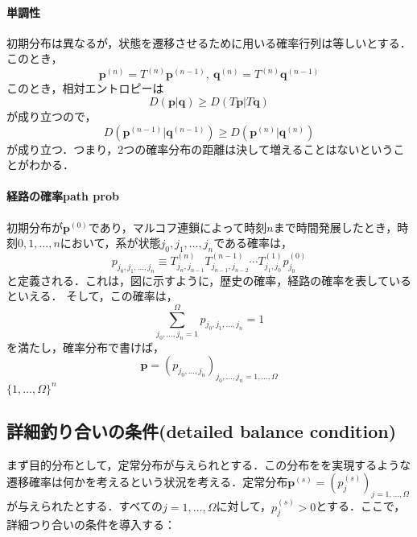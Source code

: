\paragraph{単調性}
初期分布は異なるが，状態を遷移させるために用いる確率行列は等しいとする．このとき，
\begin{equation}
    \bm{p}^{(n)}=T^{(n)}\bm{p}^{(n-1)},\ \bm{q}^{(n)}=T^{(n)}\bm{q}^{(n-1)}
\end{equation}
このとき，相対エントロピーは
\begin{equation}
    D(\bm{p}|\bm{q})\geq D(T\bm{p}|T\bm{q})
\end{equation}
が成り立つので，
\begin{equation}
    D(\bm{p}^{(n-1)}|\bm{q}^{(n-1)})\geq D(\bm{p}^{(n)}|\bm{q}^{(n)})
\end{equation}
が成り立つ．つまり，2つの確率分布の距離は決して増えることはないということがわかる．

\paragraph{経路の確率path prob}
初期分布が$\bm{p}^{(0)}$であり，マルコフ連鎖によって時刻$n$まで時間発展したとき，時刻$0,1,\ldots,n$において，系が状態$j_0,j_1,\ldots,j_n$である確率は，
\begin{equation}
    p_{j_0,j_1,\ldots,j_n}\equiv
    T_{j_n,j_{n-1}}^{(n)}T_{j_{n-1},j_{n-2}}^{(n-1)}\cdots T_{j_1,j_0}^{(1)}p_{j_0}^{(0)}
\end{equation}
と定義される．これは，図に示すように，歴史の確率，経路の確率を表しているといえる．
そして，この確率は，
\begin{equation}
    \sum_{j_0,\ldots,j_n=1}^{\Omega}p_{j_0,j_1,\ldots,j_n}=1
\end{equation}
を満たし，確率分布で書けば，
\begin{equation}
    \bm{p}=(p_{j_0,\ldots,j_n})_{j_0,\ldots,j_n=1,\ldots,\Omega}
\end{equation}
$\{1,\ldots,\Omega\}^n$






\subsection{詳細釣り合いの条件(detailed balance condition)}
まず目的分布として，定常分布が与えられとする．この分布をを実現するような遷移確率は何かを考えるという状況を考える．定常分布$\bm{p}^{(s)}=(p_j^{(s)})_{j=1,\ldots,\Omega}$が与えられたとする．すべての$j=1,\ldots,\Omega$に対して，$p^{(s)}_j>0$とする．ここで，詳細つり合いの条件を導入する：

